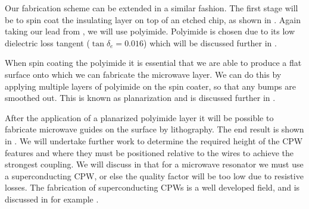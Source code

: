 Our fabrication scheme can be extended in a similar fashion. The first stage will be to spin coat the insulating layer on top of an
etched chip, as shown in . Again taking our
lead from , we will use polyimide. Polyimide is chosen
due to its low dielectric loss tangent ($\tan\delta_e = 0.016$) which will
be discussed further in .

When spin coating the polyimide it is essential that we are able to produce a
flat surface onto which we can fabricate the microwave layer. We can do this by
applying multiple layers of polyimide on the spin coater, so that any bumps are
smoothed out. This is known as planarization and is discussed further in
.

After the application of a planarized polyimide layer it will be possible to
fabricate microwave guides on the surface by lithography. The end result is
shown in . We will undertake further work to
determine the required height of the CPW features and where they must be
positioned relative to the wires to achieve the strongest coupling. We will
discuss in  that for a microwave resonator we must use
a superconducting CPW, or else the quality factor will be too low due to
resistive losses. The fabrication of superconducting CPWs is a well developed
field, and is discussed in for example .

